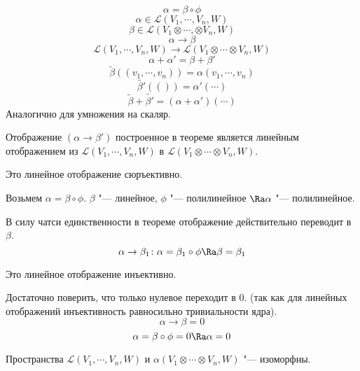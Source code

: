 \begin{description}
        $$\alpha = \beta \circ \phi$$
        $$\alpha \in \mathcal{L}(V_1, \cdots, V_n, W)$$
        $$\beta \in \mathcal{L}(V_1 \otimes \cdots,\otimes V_n, W)$$
        $$\alpha \to \beta$$
        $$\mathcal{L}(V_1, \cdots, V_n, W) \to \mathcal{L}(V_1 \otimes \cdots \otimes V_n, W)$$
        $$\alpha + \alpha' = \beta + \beta'$$
        $$\tilde{\beta}((v_1, \cdots, v_n)) = \alpha(v_1, \cdots, v_n)$$
        $$\tilde{\beta'}(()) = \alpha'(\cdots)$$
        $$\tilde{\beta} + \tilde{\beta'} = (\alpha + \alpha')(\cdots)$$
        Аналогично для умножения на скаляр. 

        Отображение $(\alpha \to \beta')$ построенное в теореме является
        линейным отображением из $\mathcal{L}(V_1, \cdots, V_n, W)$  в $\mathcal{L}(V_1 \otimes \cdots \otimes V_n, W)$.

        Это линейное отображение сюръективно. 
        
        Возьмем $\alpha = \beta \circ \phi$. $\beta$ "--- линейное, $\phi$ "--- полилинейное
        $\Ra \alpha$ "--- полилинейное. 

        В силу чатси  единственности в теореме отображение действительно переводит в $\beta$.
        $$\alpha \to \beta_1 \colon \alpha = \beta_1 \circ \phi \Ra \beta = \beta_1$$

        Это линейное отображение инъективно. 
        
        Достаточно поверить, что только нулевое переходит в 0.
        (так как для линейных отображений инъективность равносильно тривиальности ядра).
        $$\alpha \to \beta = 0$$  
        $$\alpha = \beta \circ \phi = 0 \Ra \alpha = 0$$ 

    \begin{conseq}
    Пространства $\mathcal{L}(V_1, \cdots, V_n, W)$ и 
    $\mathcal{\alpha}(V_1 \otimes \cdots \otimes V_n, W)$ "--- изоморфны. 
    \end{conseq}
\end{description}

